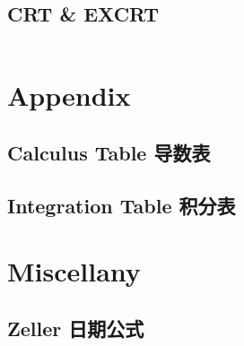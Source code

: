\documentclass[titlepage, a4paper]{article}
\begin{document}
\begin{multicols}{2}
\begin{spacing}{0.6}
				\subsection{CRT \& EXCRT} 
					\inputminted{cpp}{src/Math Combinatorics/CRT.cpp}

			\section{Appendix}
				\begin{spacing}{0.5}
				\subsection{Calculus Table 导数表}
					
				\subsection{Integration Table 积分表}
					
				\end{spacing}
			\section{Miscellany}
				\subsection{Zeller 日期公式}
					\inputminted{cpp}{src/Miscellany/日期公式.cpp}

\end{spacing}
\end{multicols}
\end{document}
